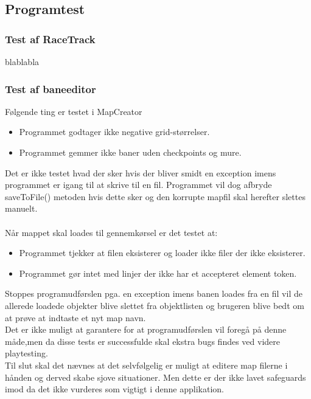 \subsection{Programtest}

\subsubsection{Test af RaceTrack}
blablabla

\subsubsection{Test af baneeditor}
Følgende ting er testet i MapCreator
\begin{itemize}
\item Programmet godtager ikke negative grid-størrelser.
\item Programmet gemmer ikke baner uden checkpoints og mure.
\end{itemize}

Det er ikke testet hvad der sker hvis der bliver smidt en exception imens programmet er igang til at skrive til en fil. Programmet vil dog afbryde saveToFile() metoden hvis dette sker og den korrupte mapfil skal herefter slettes manuelt.\\
\\
Når mappet skal loades til gennemkørsel er det testet at:
\begin{itemize}
\item Programmet tjekker at filen eksisterer og loader ikke filer der ikke eksisterer.
\item Programmet gør intet med linjer der ikke har et accepteret element token.
\end{itemize}
Stoppes programudførslen pga. en exception imens banen loades fra en fil vil de allerede loadede objekter blive slettet fra objektlisten og brugeren blive bedt om at prøve at indtaste et nyt map navn.\\
Det er ikke muligt at garantere for at programudførslen vil foregå på denne måde,men da disse tests er successfulde skal ekstra bugs findes ved videre playtesting.
\\
Til slut skal det nævnes at det selvfølgelig er muligt at editere map filerne i hånden og derved skabe sjove situationer. Men dette er der ikke lavet safeguards imod da det ikke vurderes som vigtigt i denne applikation.
